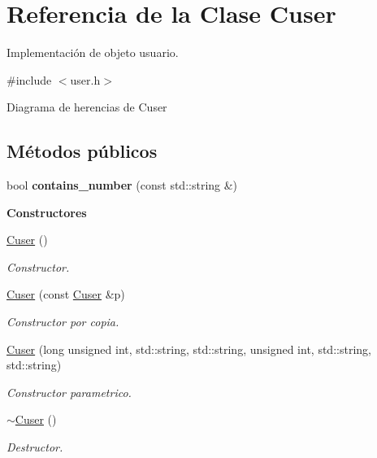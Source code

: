 \hypertarget{class_cuser}{}\section{Referencia de la Clase Cuser}
\label{class_cuser}


Implementación de objeto usuario.  




{\ttfamily \#include $<$user.\+h$>$}



Diagrama de herencias de Cuser
\subsection*{Métodos públicos}
\begin{DoxyCompactItemize}
\item 
bool {\bfseries contains\+\_\+number} (const std\+::string \&)\hypertarget{class_cuser_a110db4f47ac17223247019cbb6535fe1}{}\label{class_cuser_a110db4f47ac17223247019cbb6535fe1}

\end{DoxyCompactItemize}
\begin{Indent}{\bf Constructores}\par
\begin{DoxyCompactItemize}
\item 
\hyperlink{class_cuser_a28d26161b1076a72f30e41d52132e636}{Cuser} ()
\begin{DoxyCompactList}\small\item\em Constructor. \end{DoxyCompactList}\item 
\hyperlink{class_cuser_a6c2305c658e82cd50ec20778069b1539}{Cuser} (const \hyperlink{class_cuser}{Cuser} \&p)
\begin{DoxyCompactList}\small\item\em Constructor por copia. \end{DoxyCompactList}\item 
\hyperlink{class_cuser_af6aa55b35e256a681069a15b9a2931a2}{Cuser} (long unsigned int, std\+::string, std\+::string, unsigned int, std\+::string, std\+::string)
\begin{DoxyCompactList}\small\item\em Constructor parametrico. \end{DoxyCompactList}\item 
\hyperlink{class_cuser_a42e6967197e231f8a62d5d2c86451ca4}{$\sim$\+Cuser} ()\hypertarget{class_cuser_a42e6967197e231f8a62d5d2c86451ca4}{}\label{class_cuser_a42e6967197e231f8a62d5d2c86451ca4}

\begin{DoxyCompactList}\small\item\em Destructor. \end{DoxyCompactList}\end{DoxyCompactItemize}
\end{Indent}
